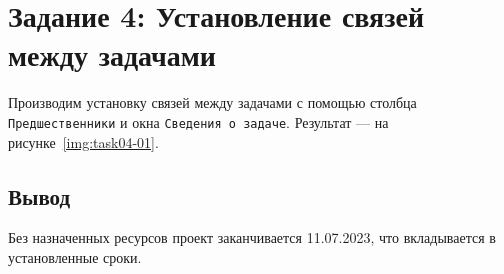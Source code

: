 \section{Задание 4: Установление связей между задачами}

Производим установку связей между задачами с помощью столбца
\texttt{Предшественники} и окна \texttt{Сведения о задаче}.
Результат --- на рисунке~\ref{img:task04-01}.


\subsection*{Вывод}

Без назначенных ресурсов проект заканчивается 11.07.2023, что вкладывается в
установленные сроки.
